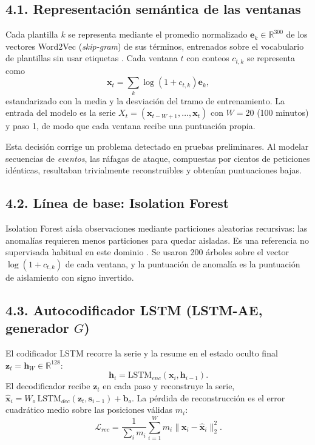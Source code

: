 \documentclass[jou,a4paper,floatsintext,donotrepeattitle]{apa7}
\newcommand{\vect}[1]{\mathbf{#1}}
\begin{document}
\subsection{4.1. Representación semántica de las ventanas}
Cada plantilla $k$ se representa mediante el promedio normalizado $\vect{e}_k \in \mathbb{R}^{300}$ de los vectores Word2Vec (\textit{skip-gram}) de sus términos, entrenados sobre el vocabulario de plantillas sin usar etiquetas \parencite{zhao2025}. Cada ventana $t$ con conteos $c_{t,k}$ se representa como
\begin{equation}
\vect{x}_t = \sum_{k} \log\!\left(1 + c_{t,k}\right)\vect{e}_k,
\label{eq:ventana}
\end{equation}
estandarizado con la media y la desviación del tramo de entrenamiento. La entrada del modelo es la serie $X_t = (\vect{x}_{t-W+1}, \ldots, \vect{x}_t)$ con $W = 20$ (100 minutos) y paso 1, de modo que cada ventana recibe una puntuación propia.

Esta decisión corrige un problema detectado en pruebas preliminares. Al modelar secuencias de \emph{eventos}, las ráfagas de ataque, compuestas por cientos de peticiones idénticas, resultaban trivialmente reconstruibles y obtenían puntuaciones bajas.

\subsection{4.2. Línea de base: Isolation Forest}
Isolation Forest aísla observaciones mediante particiones aleatorias recursivas: las anomalías requieren menos particiones para quedar aisladas. Es una referencia no supervisada habitual en este dominio \parencite{farzad2020,nasirzadeh2025}. Se usaron 200 árboles sobre el vector $\log(1+c_{t,k})$ de cada ventana, y la puntuación de anomalía es la puntuación de aislamiento con signo invertido.

\subsection{4.3. Autocodificador LSTM (LSTM-AE, generador $G$)}
El codificador LSTM recorre la serie y la resume en el estado oculto final $\vect{z}_t = \vect{h}_W \in \mathbb{R}^{128}$:
\begin{equation}
\vect{h}_i = \mathrm{LSTM}_{enc}(\vect{x}_i, \vect{h}_{i-1}).
\end{equation}
El decodificador recibe $\vect{z}_t$ en cada paso y reconstruye la serie, $\hat{\vect{x}}_i = W_o\,\mathrm{LSTM}_{dec}(\vect{z}_t, \vect{s}_{i-1}) + \vect{b}_o$. La pérdida de reconstrucción es el error cuadrático medio sobre las posiciones válidas $m_i$:
\begin{equation}
\mathcal{L}_{rec} = \frac{1}{\sum_i m_i}\sum_{i=1}^{W} m_i \lVert \vect{x}_i - \hat{\vect{x}}_i \rVert_2^2 .
\label{eq:rec}
\end{equation}
\end{document}

